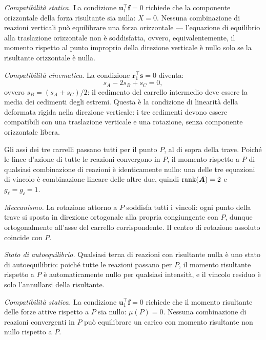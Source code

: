\begin{esempio}
\begin{svolgimento}
		\smallskip
		\noindent\textit{Compatibilità statica.}
		La condizione $\bm{u}_1^\top\bm{f} = 0$ richiede che la
		componente orizzontale della forza risultante sia nulla:
		$X = 0$. Nessuna combinazione di reazioni verticali può
		equilibrare una forza orizzontale --- l'equazione di equilibrio
		alla traslazione orizzontale non è soddisfatta, ovvero,
		equivalentemente, il momento rispetto al punto improprio della
		direzione verticale è nullo solo se la risultante orizzontale
		è nulla.
		
		\smallskip
		\noindent\textit{Compatibilità cinematica.}
		La condizione $\bm{r}_1^\top\bm{s} = 0$ diventa:
		\[
		s_A - 2s_B + s_C = 0,
		\]
		ovvero $s_B = (s_A + s_C)/2$: il cedimento del carrello
		intermedio deve essere la media dei cedimenti degli estremi.
		Questa è la condizione di linearità della deformata rigida
		nella direzione verticale: i tre cedimenti devono essere
		compatibili con una traslazione verticale e una rotazione,
		senza componente orizzontale libera.
		
		Gli assi dei tre carrelli passano tutti per il punto $P$,
		al di sopra della trave. Poiché le linee d'azione di tutte
		le reazioni convergono in $P$, il momento rispetto a $P$ di
		qualsiasi combinazione di reazioni è identicamente nullo:
		una delle tre equazioni di vincolo è combinazione lineare
		delle altre due, quindi $\operatorname{rank}(\bm{A}) = 2$ e
		$g_\ell = g_{\mathscr{i}} = 1$.
		


		
		\smallskip
		\noindent\textit{Meccanismo.}
		La rotazione attorno a $P$ soddisfa tutti i vincoli: ogni
		punto della trave si sposta in direzione ortogonale alla
		propria congiungente con $P$, dunque ortogonalmente all'asse
		del carrello corrispondente. Il centro di rotazione assoluto
		coincide con $P$.
		
		\smallskip
		\noindent\textit{Stato di autoequilibrio.}
		Qualsiasi terna di reazioni con risultante nulla è uno stato
		di autoequilibrio: poiché tutte le reazioni passano per $P$,
		il momento risultante rispetto a $P$ è automaticamente nullo
		per qualsiasi intensità, e il vincolo residuo è solo
		l'annullarsi della risultante.
		
		\smallskip
		\noindent\textit{Compatibilità statica.}
		La condizione $\bm{u}_1^\top\bm{f} = 0$ richiede che il
		momento risultante delle forze attive rispetto a $P$ sia
		nullo: $\mu(P) = 0$. Nessuna combinazione di reazioni
		convergenti in $P$ può equilibrare un carico con momento
		risultante non nullo rispetto a $P$.
		

\end{svolgimento}
\end{esempio}
